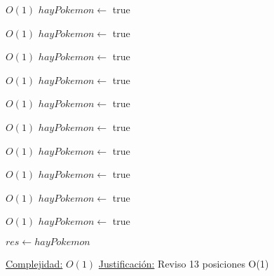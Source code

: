 \begin{Algoritmos}
\begin{algorithmic}[1]
             \Comment $O(1)$
            \State $hayPokemon \gets$ true
        \EndIf
    \EndIf

             \Comment $O(1)$
            \State $hayPokemon \gets$ true
        \EndIf
    \EndIf

\EndIf


         \Comment $O(1)$
        \State $hayPokemon \gets$ true
    \EndIf


             \Comment $O(1)$
            \State $hayPokemon \gets$ true
        \EndIf

    \EndIf

\EndIf


         \Comment $O(1)$
        \State $hayPokemon \gets$ true
    \EndIf


             \Comment $O(1)$
            \State $hayPokemon \gets$ true
        \EndIf


    \EndIf

\EndIf

         \Comment $O(1)$
        \State $hayPokemon \gets$ true
        \EndIf

             \Comment $O(1)$
            \State $hayPokemon \gets$ true
        \EndIf
    \EndIf

             \Comment $O(1)$
            \State $hayPokemon \gets$ true
        \EndIf

    \EndIf
\EndIf

         \Comment $O(1)$
        \State $hayPokemon \gets$ true
    \EndIf
\EndIf

\State $res \gets hayPokemon$

\medskip
\State \underline{Complejidad:} $O(1)$ %
\State \underline{Justificaci\'on:} Reviso 13 posiciones O(1)


\end{algorithmic}
\end{Algoritmos}
